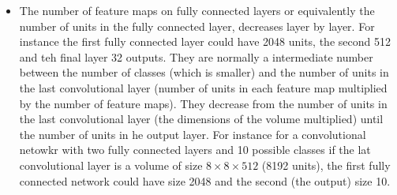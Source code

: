 \begin{itemize}
	\item The number of feature maps on fully connected layers or equivalently the number of units in the fully connected layer, decreases  layer by layer. For instance the first fully connected layer could have 2048 units, the second 512 and teh final layer 32 outputs. They are normally a intermediate number between the number of classes (which is smaller) and the number of units in the last convolutional layer (number of units in each feature map multiplied by the number of feature maps). They decrease from the number of units in the last convolutional layer (the dimensions of the volume multiplied) until the number of units in he output layer. For instance for a convolutional netowkr with two fully connected layers and 10 possible classes if the lat convolutional layer is a volume of size $8 \times 8 \times 512$ (8192 units), the first fully connected network could have size 2048 and the second (the output) size 10.
\end{itemize}



